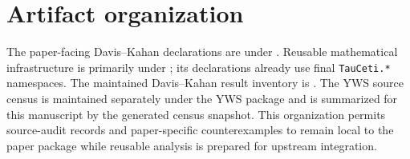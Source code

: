 \section{Artifact organization}
\label{app:artifact}

The paper-facing Davis--Kahan declarations are under
.  Reusable mathematical infrastructure
is primarily under ; its declarations already use final
\texttt{TauCeti.*} namespaces.  The maintained Davis--Kahan result inventory is
.  The YWS source
census is maintained separately under the YWS package and is summarized for
this manuscript by the generated census snapshot.  This organization permits
source-audit records and paper-specific counterexamples to remain local to the
paper package while reusable analysis is prepared for upstream integration.
